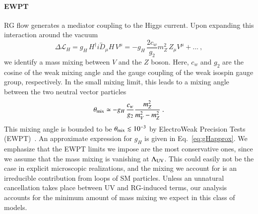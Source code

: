\documentclass[final,5p,twocolumn]{elsarticle}
\newcommand{\be}{\begin{equation}}
\newcommand{\ee}{\end{equation}}
\newcommand{\Eq}[1]{Eq.~\eqref{#1}}
\begin{document}
\paragraph{EWPT} RG flow generates a mediator coupling to the Higgs current. Upon expanding this interaction around the vacuum
\be
\Delta \mathcal{L}_H = g_H \, H^\dagger i \overleftrightarrow D_\mu H \, V^\mu =
-  g_H \, \frac{2 c_w}{g_2} m_Z^2 \, Z_\mu V^\mu + \ldots  \ ,
\label{eq:massmixingoperator}
\ee
we identify a mass mixing between $V$ and the $Z$ boson. Here, $c_w$ and $g_2$ are the cosine of the weak mixing angle and the gauge coupling of the weak isospin gauge group, respectively. In the small mixing limit, this leads to a mixing angle between the two neutral vector particles
\be
\theta_{\rm mix} \simeq - g_H \, \frac{c_w}{g_2} \frac{m_Z^2}{m_V^2 - m_Z^2} \ . 
\ee
This mixing angle is bounded to be $\theta_{\rm mix} \lesssim 10^{-3}$ by ElectroWeak Precision Tests (EWPT)~\cite{Agashe:2014kda}. An approximate expression for $g_H$ is given in \Eq{eq:gHapprox}. We emphasize that the EWPT limits we impose are the most conservative ones, since we assume that the mass mixing is vanishing at $\Lambda_{\rm UV}$. This could easily not be the case in explicit microscopic realizations, and the mixing we account for is an irreducible contribution from loops of SM particles. Unless an unnatural cancellation takes place between UV and RG-induced terms, our analysis accounts for the minimum amount of mass mixing we expect in this class of models.
\end{document}
